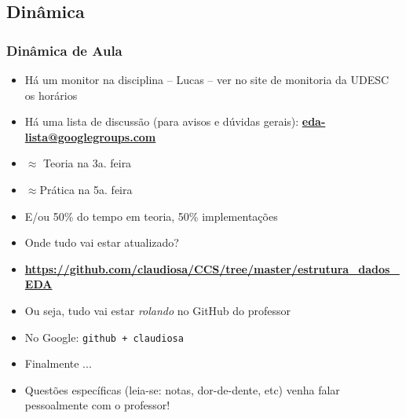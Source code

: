 \subsection{Dinâmica}
\begin{frame} [allowframebreaks=0.9]

    \frametitle{Dinâmica de Aula}

    \begin{itemize}
    
       \item Há um monitor na disciplina -- Lucas -- ver no site de monitoria da UDESC 
       os horários
       
       \item Há uma lista de discussão (para avisos e dúvidas gerais):  \textbf{\url{eda-lista@googlegroups.com}}
       
      \item $\approx $ Teoria na 3a. feira
      \item $\approx $Prática na 5a. feira
      \item E/ou 50\% do tempo em teoria, 50\% implementações 
      \item Onde tudo vai estar atualizado?
   \end{itemize}
    \pause
 
 \newpage
    
  \begin{itemize}    
      \item \textcolor{red}{\textbf{\url{https://github.com/claudiosa/CCS/tree/master/estrutura_dados_EDA}}} 
     
      \item Ou seja, tudo vai estar \textit{rolando} no GitHub do professor
      
      \item No Google: \texttt{github + claudiosa}
   
      \item Finalmente ...   
  \end{itemize}
    
    
    \pause
    \newpage
    
    \begin{itemize}    
    
   \item Questões específicas (leia-se: notas, dor-de-dente, etc) venha falar 
   pessoalmente com o professor!
      
   \end{itemize}

\end{frame}



